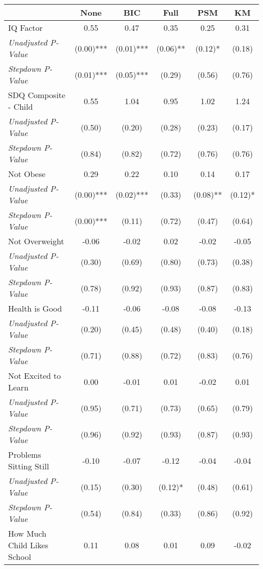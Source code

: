 \begin{tabular}{l c c c c c}
\toprule
 & None & BIC & Full & PSM & KM \\
\midrule
IQ Factor & 0.55 & 0.47 & 0.35 & 0.25 & 0.31 \\
\quad \textit{Unadjusted P-Value} & (0.00)*** & (0.01)*** & (0.06)** & (0.12)* & (0.18) \\
\quad \textit{Stepdown P-Value} & (0.01)*** & (0.05)*** & (0.29) & (0.56) & (0.76) \\
SDQ Composite - Child & 0.55 & 1.04 & 0.95 & 1.02 & 1.24 \\
\quad \textit{Unadjusted P-Value} & (0.50) & (0.20) & (0.28) & (0.23) & (0.17) \\
\quad \textit{Stepdown P-Value} & (0.84) & (0.82) & (0.72) & (0.76) & (0.76) \\
Not Obese & 0.29 & 0.22 & 0.10 & 0.14 & 0.17 \\
\quad \textit{Unadjusted P-Value} & (0.00)*** & (0.02)*** & (0.33) & (0.08)** & (0.12)* \\
\quad \textit{Stepdown P-Value} & (0.00)*** & (0.11) & (0.72) & (0.47) & (0.64) \\
Not Overweight & -0.06 & -0.02 & 0.02 & -0.02 & -0.05 \\
\quad \textit{Unadjusted P-Value} & (0.30) & (0.69) & (0.80) & (0.73) & (0.38) \\
\quad \textit{Stepdown P-Value} & (0.78) & (0.92) & (0.93) & (0.87) & (0.83) \\
Health is Good & -0.11 & -0.06 & -0.08 & -0.08 & -0.13 \\
\quad \textit{Unadjusted P-Value} & (0.20) & (0.45) & (0.48) & (0.40) & (0.18) \\
\quad \textit{Stepdown P-Value} & (0.71) & (0.88) & (0.72) & (0.83) & (0.76) \\
Not Excited to Learn & 0.00 & -0.01 & 0.01 & -0.02 & 0.01 \\
\quad \textit{Unadjusted P-Value} & (0.95) & (0.71) & (0.73) & (0.65) & (0.79) \\
\quad \textit{Stepdown P-Value} & (0.96) & (0.92) & (0.93) & (0.87) & (0.93) \\
Problems Sitting Still & -0.10 & -0.07 & -0.12 & -0.04 & -0.04 \\
\quad \textit{Unadjusted P-Value} & (0.15) & (0.30) & (0.12)* & (0.48) & (0.61) \\
\quad \textit{Stepdown P-Value} & (0.54) & (0.84) & (0.33) & (0.86) & (0.92) \\
How Much Child Likes School & 0.11 & 0.08 & 0.01 & 0.09 & -0.02 \\

\end{tabular}
